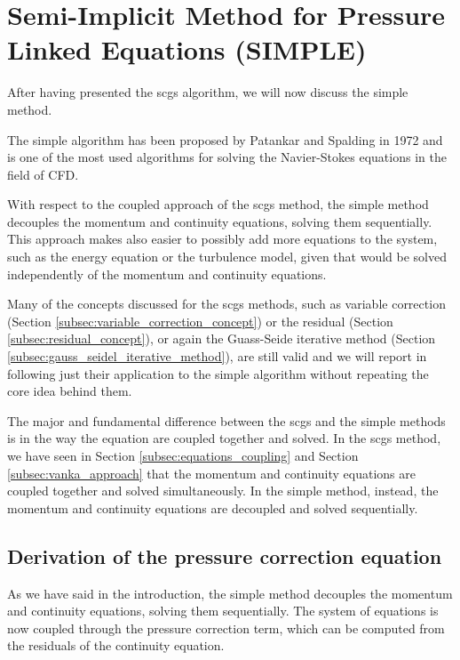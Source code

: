 \section{Semi-Implicit Method for Pressure Linked Equations (SIMPLE)}
\label{sec:simple}

After having presented the \acrshort{scgs} algorithm, we will now discuss the \acrfull{simple} method.

The \acrshort{simple} algorithm has been proposed by Patankar and Spalding in 1972 \cite{Patankar1972ACP} and is one of the most used algorithms for solving the Navier-Stokes equations in the field of CFD.

With respect to the coupled approach of the \acrshort{scgs} method, the \acrshort{simple} method decouples the momentum and continuity equations, solving them sequentially.
This approach makes also easier to possibly add more equations to the system, such as the energy equation or the turbulence model, given that would be solved independently of the momentum and continuity equations.

Many of the concepts discussed for the \acrshort{scgs} methods, such as variable correction (Section \ref{subsec:variable_correction_concept}) or the residual (Section \ref{subsec:residual_concept}), or again the Guass-Seide iterative method (Section \ref{subsec:gauss_seidel_iterative_method}), are still valid and we will report in following just their application to the \acrshort{simple} algorithm without repeating the core idea behind them.



The major and fundamental difference between the \acrshort{scgs} and the \acrshort{simple} methods is in the way the equation are coupled together and solved.
In the \acrshort{scgs} method, we have seen in Section \ref{subsec:equations_coupling} and Section \ref{subsec:vanka_approach} that the momentum and continuity equations are coupled together and solved simultaneously.
In the \acrshort{simple} method, instead, the momentum and continuity equations are decoupled and solved sequentially.


\subsection{Derivation of the pressure correction equation}

As we have said in the introduction, the \acrshort{simple} method decouples the momentum and continuity equations, solving them sequentially.
The system of equations is now coupled through the pressure correction term, which can be computed from the residuals of the continuity equation.

